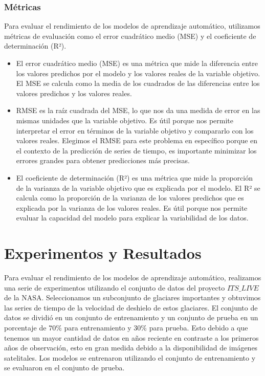 \documentclass[sigconf,language=spanish]{acmart}
\begin{document}
\subsubsection{Métricas}

Para evaluar el rendimiento de los modelos de aprendizaje automático, utilizamos métricas de evaluación como el error cuadrático medio (MSE) y el coeficiente de determinación (R²).

\begin{itemize}
  \item El error cuadrático medio (MSE) es una métrica que mide la diferencia entre los valores predichos por el modelo y los valores reales de la variable objetivo.
El MSE se calcula como la media de los cuadrados de las diferencias entre los valores predichos y los valores reales.
  \item RMSE es la raíz cuadrada del MSE, lo que nos da una medida de error en las mismas unidades que la variable objetivo.
  Es útil porque nos permite interpretar el error en términos de la variable objetivo y compararlo con los valores reales.
Elegimos el RMSE para este problema en específico porque en el contexto de la predicción de series de tiempo, es importante minimizar los errores grandes para obtener predicciones más precisas.
  \item El coeficiente de determinación (R²) es una métrica que mide la proporción de la varianza de la variable objetivo que es explicada por el modelo.
El R² se calcula como la proporción de la varianza de los valores predichos que es explicada por la varianza de los valores reales.
Es útil porque nos permite evaluar la capacidad del modelo para explicar la variabilidad de los datos.
\end{itemize}

\section{Experimentos y Resultados}

Para evaluar el rendimiento de los modelos de aprendizaje automático, realizamos una serie de experimentos utilizando el conjunto de datos del proyecto  $ITS\_LIVE$ de la NASA.
Seleccionamos un subconjunto de glaciares importantes y obtuvimos las series de tiempo de la velocidad de deshielo de estos glaciares.
El conjunto de datos se dividió en un conjunto de entrenamiento y un conjunto de prueba en un porcentaje de $70\%$ para entrenamiento y $30\%$ para prueba.
Esto debido a que tenemos un mayor cantidad de datos en años reciente en contraste a los primeros años de observación, esto en gran medida debido a la disponibilidad de imágenes satelitales.  
Los modelos se entrenaron utilizando el conjunto de entrenamiento y se evaluaron en el conjunto de prueba.
\end{document}
